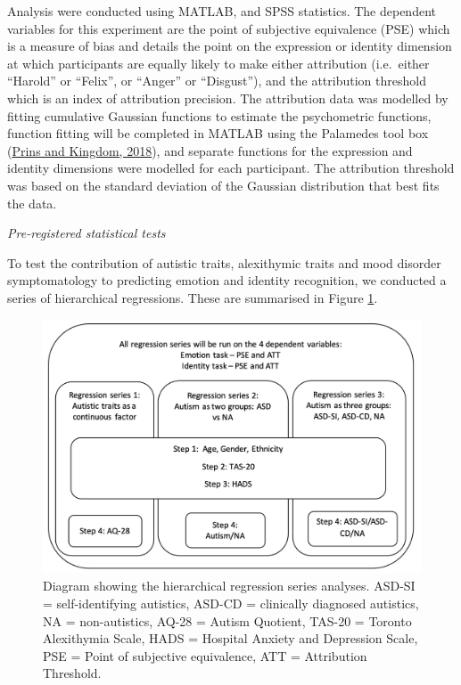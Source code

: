 \documentclass[
]{article}
\begin{document}
Analysis were conducted using MATLAB, and SPSS statistics. The dependent variables for this experiment are the point of subjective equivalence (PSE) which is a measure of bias and details the point on the expression or identity dimension at which participants are equally likely to make either attribution (i.e.~either ``Harold'' or ``Felix'', or ``Anger'' or ``Disgust''), and the attribution threshold which is an index of attribution precision. The attribution data was modelled by fitting cumulative Gaussian functions to estimate the psychometric functions, function fitting will be completed in MATLAB using the Palamedes tool box (\protect\hyperlink{ref-prins2018a}{Prins and Kingdom, 2018}), and separate functions for the expression and identity dimensions were modelled for each participant. The attribution threshold was based on the standard deviation of the Gaussian distribution that best fits the data.

\emph{Pre-registered statistical tests}

To test the contribution of autistic traits, alexithymic traits and mood disorder symptomatology to predicting emotion and identity recognition, we conducted a series of hierarchical regressions. These are summarised in Figure \ref{fig:figure1}.

\begin{figure}

{\centering \includegraphics[width=0.8\linewidth]{Fig1} 

}

\caption{Diagram showing the hierarchical regression series analyses. ASD-SI = self-identifying autistics, ASD-CD = clinically diagnosed autistics, NA = non-autistics,  AQ-28 = Autism Quotient, TAS-20 = Toronto Alexithymia Scale, HADS = Hospital Anxiety and Depression Scale, PSE = Point of subjective equivalence, ATT = Attribution Threshold.}\label{fig:figure1}
\end{figure}
\end{document}
